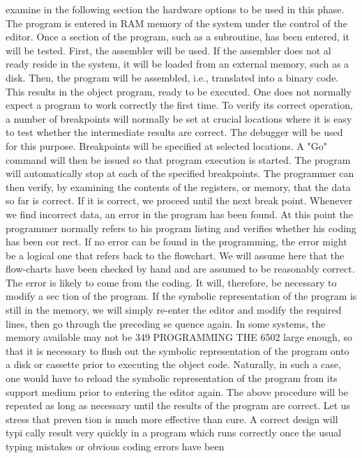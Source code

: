 \documentclass{book}
\begin{document}
{{{{{{{{{{{{{{{{{{{{{{{{{{{{{{{{{{{{{{{{{{{{{{{{{{{{{{{{{{{{{{{{{{{{{{{{{{{{{{{{{{{{{{{{{{{{{{{{{{{{{{{{{{{{{{{{{{{{{{{{{{{{{{{{{{{{{{{{{{{{examine in the following section the hardware options to be used in
this phase.
The program is entered in RAM memory of the system under
the control of the editor. Once a section of the program, such as a
subroutine, has been entered, it will be tested.
First, the assembler will be used. If the assembler does not al
ready reside in the system, it will be loaded from an external
memory, such as a disk. Then, the program will be assembled, i.e.,
translated into a binary code. This results in the object program,
ready to be executed.
One does not normally expect a program to work correctly the
first time. To verify its correct operation, a number of breakpoints
will normally be set at crucial locations where it is easy to test
whether the intermediate results are correct. The debugger will
be used for this purpose. Breakpoints will be specified at selected
locations. A "Go" command will then be issued so that program
execution is started. The program will automatically stop at each
of the specified breakpoints. The programmer can then verify, by
examining the contents of the registers, or memory, that the data
so far is correct. If it is correct, we proceed until the next break
point. Whenever we find incorrect data, an error in the program
has been found. At this point the programmer normally refers to
his program listing and verifies whether his coding has been cor
rect. If no error can be found in the programming, the error might
be a logical one that refers back to the flowchart. We will
assume here that the flow-charts have been checked by hand and
are assumed to be reasonably correct. The error is likely to come
from the coding. It will, therefore, be necessary to modify a sec
tion of the program. If the symbolic representation of the program
is still in the memory, we will simply re-enter the editor and
modify the required lines, then go through the preceding se
quence again. In some systems, the memory available may not be
349
PROGRAMMING THE 6502
large enough, so that it is necessary to flush out the symbolic
representation of the program onto a disk or cassette prior to
executing the object code. Naturally, in such a case, one would
have to reload the symbolic representation of the program from
its support medium prior to entering the editor again.
The above procedure will be repeated as long as necessary until
the results of the program are correct. Let us stress that preven
tion is much more effective than cure. A correct design will typi
cally result very quickly in a program which runs correctly once
the usual typing mistakes or obvious coding errors have been
}}}}}}}}}}}}}}}}}}}}}}}}}}}}}}}}}}}}}}}}}}}}}}}}}}}}}}}}}}}}}}}}}}}}}}}}}}}}}}}}}}}}}}}}}}}}}}}}}}}}}}}}}}}}}}}}}}}}}}}}}}}}}}}}}}}}}}}}}}}}
\end{document}
